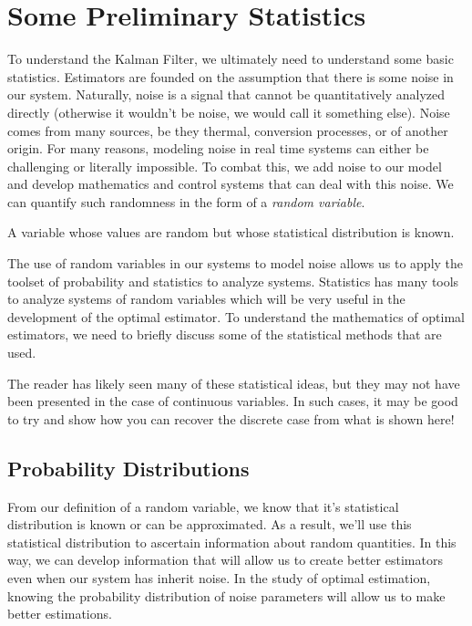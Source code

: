 \section{Some Preliminary Statistics}

To understand the Kalman Filter, we ultimately need to understand some basic statistics. Estimators are founded on the assumption that there is some noise in our system. Naturally, noise is a signal that cannot be quantitatively analyzed directly (otherwise it wouldn't be noise, we would call it something else). Noise comes from many sources, be they thermal, conversion processes, or of another origin. For many reasons, modeling noise in real time systems can either be challenging or literally impossible. To combat this, we add noise to our model and develop mathematics and control systems that can deal with this noise. We can quantify such randomness in the form of a \textit{random variable}.

\begin{definition}
A  variable whose values are random but whose statistical distribution is known.
\end{definition}

The use of random variables in our systems to model noise allows us to apply the toolset of probability and statistics to analyze systems. Statistics has many tools to analyze systems of random variables which will be very useful in the development of the optimal estimator. To understand the mathematics of optimal estimators, we need to briefly discuss some of the statistical methods that are used.

The reader has likely seen many of these statistical ideas, but they may not have been presented in the case of continuous variables. In such cases, it may be good to try and show how you can recover the discrete case from what is shown here!

\subsection{Probability Distributions}

From our definition of a random variable, we know that it's statistical distribution is known or can be approximated. As a result, we'll use this statistical distribution to ascertain information about random quantities. In this way, we can develop information that will allow us to create better estimators even when our system has inherit noise. In the study of optimal estimation, knowing the probability distribution of noise parameters will allow us to make better estimations.


